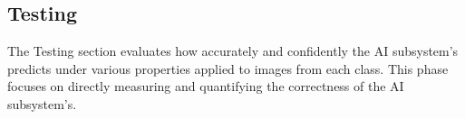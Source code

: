 \documentclass[10pt, conference, a4paper, final]{IEEEtran}
\begin{document}






\subsection{Testing }

The Testing section evaluates how accurately and confidently the  AI subsystem's predicts under various properties applied to images from each class. This phase focuses on directly measuring and quantifying the correctness of the  AI subsystem's.
\end{document}
